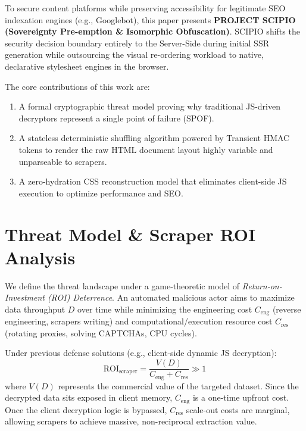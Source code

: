 \documentclass[10pt,journal,compsoc]{IEEEtran}
\begin{document}
To secure content platforms while preserving accessibility for legitimate SEO indexation engines (e.g., Googlebot), this paper presents \textbf{PROJECT SCIPIO (Sovereignty Pre-emption \& Isomorphic Obfuscation)}. SCIPIO shifts the security decision boundary entirely to the Server-Side during initial SSR generation while outsourcing the visual re-ordering workload to native, declarative stylesheet engines in the browser. 

The core contributions of this work are:
\begin{enumerate}
    \item A formal cryptographic threat model proving why traditional JS-driven decryptors represent a single point of failure (SPOF).
    \item A stateless deterministic shuffling algorithm powered by Transient HMAC tokens to render the raw HTML document layout highly variable and unparseable to scrapers.
    \item A zero-hydration CSS reconstruction model that eliminates client-side JS execution to optimize performance and SEO.
\end{enumerate}

\section{Threat Model \& Scraper ROI Analysis}
We define the threat landscape under a game-theoretic model of \emph{Return-on-Investment (ROI) Deterrence}. An automated malicious actor aims to maximize data throughput $D$ over time while minimizing the engineering cost $C_{\text{eng}}$ (reverse engineering, scrapers writing) and computational/execution resource cost $C_{\text{res}}$ (rotating proxies, solving CAPTCHAs, CPU cycles).

Under previous defense solutions (e.g., client-side dynamic JS decryption):
\begin{equation}
    \text{ROI}_{\text{scraper}} = \frac{V(D)}{C_{\text{eng}} + C_{\text{res}}} \gg 1
\end{equation}
where $V(D)$ represents the commercial value of the targeted dataset. Since the decrypted data sits exposed in client memory, $C_{\text{eng}}$ is a one-time upfront cost. Once the client decryption logic is bypassed, $C_{\text{res}}$ scale-out costs are marginal, allowing scrapers to achieve massive, non-reciprocal extraction value.
\end{document}
